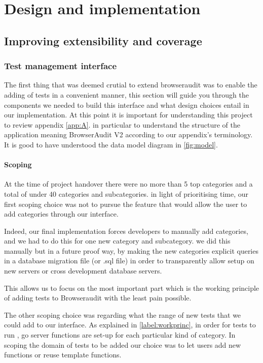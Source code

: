 \chapter{Design and implementation}

\section{Improving extensibility and coverage}
\label{label:addtest}

\subsection{Test management interface}

The first thing that was deemed crutial to extend browseraudit was to enable the adding of tests in a convenient manner, this section will
guide you through the components we needed to build this interface and what design choices entail in our implementation.
At this point it is important for understanding this project to review appendix \ref{app:A}. in particular to understand
the structure of the application meaning BrowserAudit V2 according to our appendix's terminology. It is good to have understood
the data model diagram in \ref{fig:model}. 

\subsubsection{Scoping}

At the time of project handover there were no more than 5 top categories and a total of under 40 categories and subcategories.
in light of prioritising time, our first scoping choice was not to pursue the feature that would allow the user to add categories through our interface.

Indeed, our final implementation forces developers to manually add categories, and we had to do this for one new category and subcategory.
we did this manually but in a future proof way, by making the new categories explicit queries in a database migration file (or .sql file) in order to transparently allow setup on new
servers or cross development database servers.

This allows us to focus on the most important part which is the working principle of adding tests to Browseraudit with the least pain possible.

The other scoping choice was regarding what the range of new tests that we could add to our interface. As explained in \ref{label:workprinc}, 
in order for tests to run , go server functions are set-up for each particular kind of category. 
In scoping the domain of tests to be added our choice was to let users add new functions or reuse template functions.

